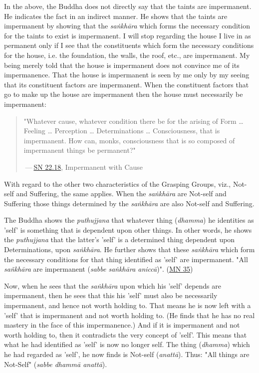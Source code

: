 In the above, the Buddha does not directly say that the taints are
impermanent. He indicates the fact in an indirect manner. He shows that
the taints are impermanent by showing that the \emph{saṅkhāra} which forms
the necessary condition for the taints to exist is impermanent. I will
stop regarding the house I live in as permanent only if I see that the
constituents which form the necessary conditions for the house, i.e. the
foundation, the walls, the roof, etc., are impermanent. My being merely
told that the house is impermanent does not convince me of its
impermanence. That the house is impermanent is seen by me only by my
seeing that its constituent factors are impermanent. When the
constituent factors that go to make up the house are impermanent then
the house must necessarily be impermanent:


\begin{quotation}
"Whatever cause, whatever condition there be for the arising of Form …​
Feeling …​ Perception …​ Determinations …​ Consciousness, that is
impermanent. How can, monks, consciousness that is so composed of impermanent
things be permanent?"


 — \href{https://suttacentral.net/sn22.18/en/bodhi}{SN 22.18}, Impermanent with Cause


\end{quotation}

With regard to the other two characteristics of the
Grasping Groups, viz., Not-self and Suffering, the same applies. When
the \emph{saṅkhāra} are Not-self and Suffering those things determined by the
\emph{saṅkhāra} are also Not-self and Suffering.


The Buddha shows the \emph{puthujjana} that whatever thing (\emph{dhamma}) he
identities as 'self' is something that is dependent upon other things.
In other words, he shows the \emph{puthujjana} that the latter’s 'self' is a
determined thing dependent upon Determinations, upon \emph{saṅkhāra}. He
further shows that these \emph{saṅkhāra} which form the necessary conditions
for that thing identified as 'self' are impermanent. "All \emph{sañkhāra} are
impermanent (\emph{sabbe saṅkhāra aniccā})". (\href{https://suttacentral.net/mn35/en/sujato}{MN 35})


Now, when he sees that the \emph{saṅkhāra} upon which his 'self' depends are
impermanent, then he sees that this his 'self' must also be necessarily
impermanent, and hence not worth holding to. That means he is now left
with a 'self' that is impermanent and not worth holding to. (He finds
that he has no real mastery in the face of this impermanence.) And if it
is impermanent and not worth holding to, then it contradicts the very
concept of 'self'. This means that what he had identified as 'self' is
now no longer self. The thing (\emph{dhamma}) which he had regarded as
'self', he now finds is Not-self (\emph{anattā}). Thus: "All things are
Not-Self" (\emph{sabbe dhammā anattā}).


